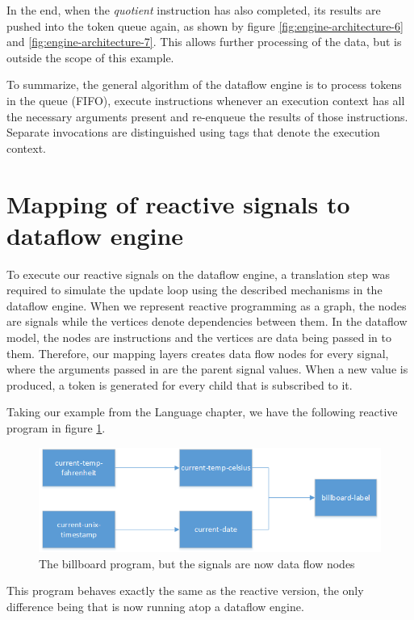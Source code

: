 In the end, when the \textit{quotient} instruction has also completed, its results are pushed into the token queue again, as shown by figure \ref{fig:engine-architecture-6} and \ref{fig:engine-architecture-7}. This allows further processing of the data, but is outside the scope of this example. 

To summarize, the general algorithm of the dataflow engine is to process tokens in the queue (FIFO), execute instructions whenever an execution context has all the necessary arguments present and re-enqueue the results of those instructions. Separate invocations are distinguished using tags that denote the execution context.

\section{Mapping of reactive signals to dataflow engine}

To execute our reactive signals on the dataflow engine, a translation step was required to simulate the update loop using the described mechanisms in the dataflow engine.
When we represent reactive programming as a graph, the nodes are signals while the vertices denote dependencies between them.
In the dataflow model, the nodes are instructions and the vertices are data being passed in to them. Therefore, our mapping layers creates data flow nodes for every signal, where the arguments passed in are the parent signal values. When a new value is produced, a token is generated for every child that is subscribed to it.

Taking our example from the Language chapter, we have the following reactive program in figure \ref{fig:engine-mapping-1}.

\begin{figure}[h!]
	\includegraphics[width=\textwidth]{images/Engine-Mapping-1.png}
	\caption{The billboard program, but the signals are now data flow nodes}
	\label{fig:engine-mapping-1}
\end{figure}

This program behaves exactly the same as the reactive version, the only difference being that is now running atop a dataflow engine.

